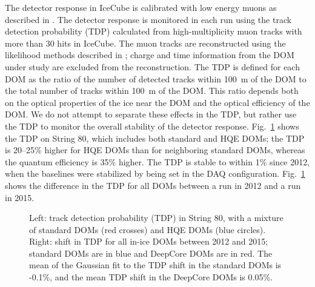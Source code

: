 The detector response in IceCube is calibrated with low energy muons as
described in \cite{IC3:ereco}. The detector response is monitored in each run using the track
detection probability (TDP) calculated from high-multiplicity muon tracks
with more than 30 hits in IceCube. The muon 
tracks are reconstructed using the likelihood methods described in
\cite{Ahrens:2003fg}; charge and time information from the DOM under
study are excluded
from the reconstruction. The TDP is
defined for each DOM as the ratio of the number of detected tracks
within 100~m of the DOM to the total number of tracks within 100~m of
the DOM. This ratio depends both on the optical properties of the ice
near the DOM and the optical efficiency of the DOM. We do not attempt
to separate
these effects in the TDP, but rather use the TDP to monitor the
overall stability of the detector response. Fig.~\ref{fig:tdp} shows the TDP on
String 80, which includes both standard and HQE DOMs; the TDP is
20--25\% higher for HQE DOMs than for neighboring standard
DOMs, whereas the quantum efficiency is 35\% higher. The TDP is stable to within 1\% since 2012, when the baselines
were stabilized by being set in the DAQ configuration. Fig.~\ref{fig:tdp} shows
the difference in the TDP for all DOMs between a run in 2012 and a run
in 2015.

\begin{figure}[!h]
  \captionsetup[subfigure]{labelformat=empty}
  \centering
  \caption{Left: track detection probability (TDP) in String 80, with a
    mixture of standard DOMs (red crosses) and HQE DOMs (blue
    circles). Right: shift in TDP for all in-ice DOMs between 2012 and 2015; standard DOMs are in blue and
    DeepCore DOMs are in red. The mean of the Gaussian fit to
    the TDP shift in the standard DOMs is -0.1\%, and the mean 
    TDP shift in the DeepCore DOMs is 0.05\%.}
  \label{fig:tdp}
\end{figure}

